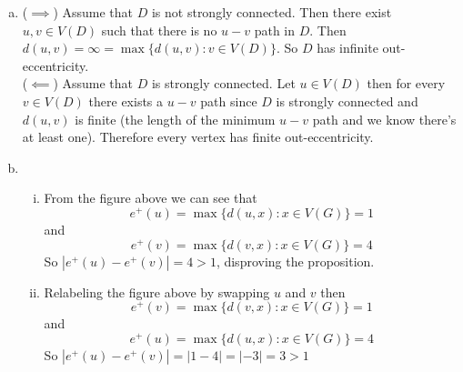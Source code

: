 \begin{enumerate}[a.]
    \item ($\implies$) Assume that $D$ is not strongly connected. Then there
			exist $u, v \in V(D)$ such that there is no $u-v$ path in $D$. Then
			$d(u, v) = \infty = \max\{d(u, v) : v \in V(D)\}$. So $D$ has
			infinite out-eccentricity. \\
    ($\impliedby$) Assume that $D$ is strongly connected. Let $u \in V(D)$ 
		then for every $v \in V(D)$ there exists a $u-v$ path since $D$ is strongly
		connected and $d(u, v)$ is finite (the length of the minimum $u-v$ path and
		we know there's at least one). Therefore every vertex has finite out-eccentricity. 
    \item 
        \begin{enumerate}[(i)]
            \begin{figure}[H]
            \centering
            \texttt{[image: 218.png]}
            \end{figure}
            \item From the figure above we can see that  $$e^+(u) = \max \{d(u, x) : x \in V(G)\} = 1$$ and $$e^+(v) = \max \{d(v, x) : x \in V(G)\} = 4$$ 
                So $|e^+(u) - e^+(v)| = 4 > 1$,
                disproving the proposition.
            \item Relabeling the figure above by swapping $u$ and $v$ then 
             $$e^+(v) = \max \{d(v, x) : x \in V(G)\} = 1$$ and $$e^+(u) = \max \{d(u, x) : x \in V(G)\} = 4$$ 
                So $|e^+(u) - e^+(v)| = |1 - 4| = |-3| = 3 > 1$
        \end{enumerate}
\end{enumerate}
